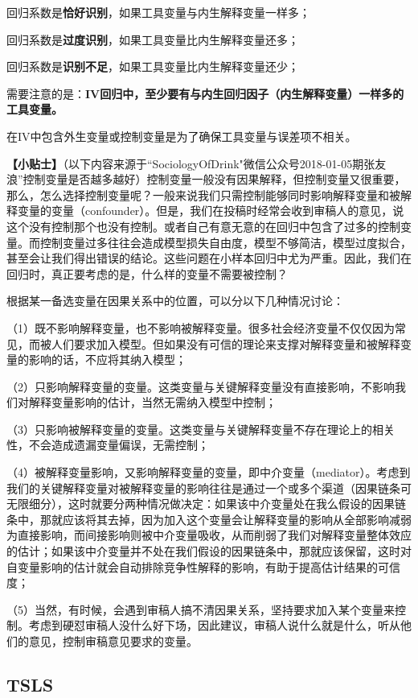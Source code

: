 \documentclass[cn,12pt,math=newtx,citestyle=gb7714-2015,bibstyle=gb7714-2015]{elegantbook}
\begin{document}
	回归系数是\textbf{恰好识别}，如果工具变量与内生解释变量一样多；
	
	回归系数是\textbf{过度识别}，如果工具变量比内生解释变量还多；
	
	回归系数是\textbf{识别不足}，如果工具变量比内生解释变量还少；
	
	需要注意的是：\textbf{IV回归中，至少要有与内生回归因子（内生解释变量）一样多的工具变量。}
	
	在IV中包含外生变量或控制变量是为了确保工具变量与误差项不相关。
	
	\textbf{【小贴士】}（以下内容来源于“SociologyOfDrink"微信公众号2018-01-05期张友浪”控制变量是否越多越好）控制变量一般没有因果解释，但控制变量又很重要，那么，怎么选择控制变量呢？一般来说我们只需控制能够同时影响解释变量和被解释变量的变量（confounder）。但是，我们在投稿时经常会收到审稿人的意见，说这个没有控制那个也没有控制。或者自己有意无意的在回归中包含了过多的控制变量。而控制变量过多往往会造成模型损失自由度，模型不够简洁，模型过度拟合，甚至会让我们得出错误的结论。这些问题在小样本回归中尤为严重。因此，我们在回归时，真正要考虑的是，什么样的变量不需要被控制？
	
	根据某一备选变量在因果关系中的位置，可以分以下几种情况讨论：
	
	（1）既不影响解释变量，也不影响被解释变量。很多社会经济变量不仅仅因为常见，而被人们要求加入模型。但如果没有可信的理论来支撑对解释变量和被解释变量的影响的话，不应将其纳入模型；
	
	（2）只影响解释变量的变量。这类变量与关键解释变量没有直接影响，不影响我们对解释变量影响的估计，当然无需纳入模型中控制；
	
	（3）只影响被解释变量的变量。这类变量与关键解释变量不存在理论上的相关性，不会造成遗漏变量偏误，无需控制；
	
	（4）被解释变量影响，又影响解释变量的变量，即中介变量（mediator）。考虑到我们的关键解释变量对被解释变量的影响往往是通过一个或多个渠道（因果链条可无限细分），这时就要分两种情况做决定：如果该中介变量处在我么假设的因果链条中，那就应该将其去掉，因为加入这个变量会让解释变量的影响从全部影响减弱为直接影响，而间接影响则被中介变量吸收，从而削弱了我们对解释变量整体效应的估计；如果该中介变量并不处在我们假设的因果链条中，那就应该保留，这时对自变量影响的估计就会自动排除竞争性解释的影响，有助于提高估计结果的可信度；
	
	（5）当然，有时候，会遇到审稿人搞不清因果关系，坚持要求加入某个变量来控制。考虑到硬怼审稿人没什么好下场，因此建议，审稿人说什么就是什么，听从他们的意见，控制审稿意见要求的变量。
	
	\subsection{TSLS}
	
\end{document}
